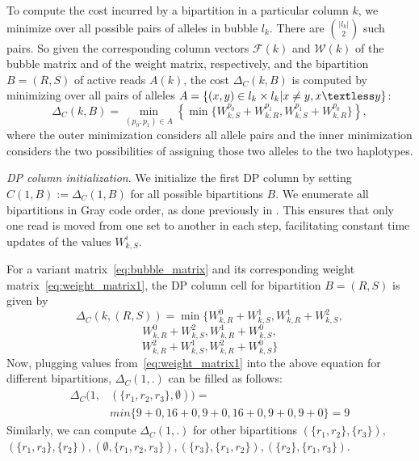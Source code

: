 To compute the cost incurred by a bipartition in a particular column $k$, we minimize over all possible pairs of alleles in bubble $l_k$.
There are ${|l_k| \choose 2}$ such pairs.
So given the corresponding column vectors $\mathcal{F}(k)$ and $\mathcal{W}(k)$ of the bubble matrix and of the weight matrix, respectively, and the bipartition $B=(R,S)$ of active reads $A(k)$, the cost $\Delta_C(k,B)$ is computed by minimizing over all pairs of alleles
$A = \{(x,y) \in l_k \times l_k | x \ne y, x\textless y\}$:
\begin{equation}\label{eq:dp-cell}
  \Delta_C(k,B)= \min_{(p_0,p_1)\in {A}}\left\{\min\{W_{k,S}^{p_0} + W_{k,R}^{p_1}, W_{k,S}^{p_1} + W_{k,R}^{p_0}\}\right\},
\end{equation}
where the outer minimization considers all allele pairs and the inner minimization considers the two possibilities of assigning those two alleles to the two haplotypes.

   

%     

\textit{DP column initialization}. 
We initialize the first DP column by setting $C(1,B):=\Delta_C(1,B)$ for all possible bipartitions $B$.
We enumerate all bipartitions in Gray code order, as done previously in \cite{Patterson2015}.
This ensures that only one read is moved from one set to another in each step, facilitating constant time updates of the values $W_{k,S}^i$.

For a variant matrix~\eqref{eq:bubble_matrix} and its corresponding weight matrix~\eqref{eq:weight_matrix1}, the DP column cell for bipartition $B=(R,S)$ is given by
\[\Delta_C(k,(R,S))= \min\big\{W^0_{k,R} + W^1_{k,S}, W^1_{k,R} + W^2_{k,S}, \]
\[W^0_{k,R} + W^2_{k,S}, W^1_{k,R} + W^0_{k,S},\]
\[W^2_{k,R} + W^1_{k,S}, W^2_{k,R} + W^0_{k,S} \big\}\]
Now, plugging values from~\eqref{eq:weight_matrix1} into the above equation for different bipartitions, $\Delta_C(1,.)$ can be filled as follows:
\[
\begin{split}
\Delta_C(1,& (\{r_1,r_2,r_3\},\emptyset)) =\\ & min\{9+0, 16+0, 9+0,16+0, 9+0, 9+0\} = 9 
\end{split}
\]
Similarly, we can compute $\Delta_C(1,.)$ for other bipartitions $(\{r_1,r_2\},\{r_3\}),$\\
$(\{r_1,r_3\},\{r_2\}), (\emptyset,\{r_1,r_2,r_3\}), (\{r_3\},\{r_1,r_2\}), (\{r_2\},\{r_1,r_3\})$.

